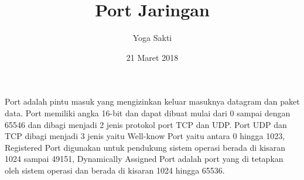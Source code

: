 \documentclass[12pt, a4 paper]{article}
\begin{document}
\title{Port Jaringan}
\author{Yoga Sakti}
\date{21 Maret 2018}
\maketitle
Port adalah pintu masuk yang mengizinkan keluar masuknya datagram dan paket data. Port memiliki angka 16-bit dan dapat dibuat mulai dari 0 sampai dengan 65546 dan dibagi menjadi 2 jenis protokol port TCP dan UDP. Port UDP dan TCP dibagi menjadi 3 jenis yaitu Well-know Port yaitu antara 0 hingga 1023, Registered Port digunakan untuk pendukung sistem operasi berada di kisaran 1024 sampai 49151, Dynamically Assigned Port adalah port yang di tetapkan oleh sistem operasi dan berada di kisaran 1024 hingga 65536.
\end{document}
